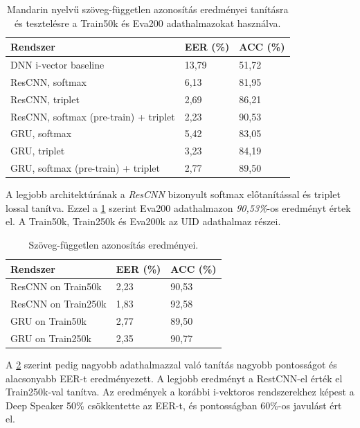 \begin{table}[!ht]
	\begin{tabular}{*3l} \toprule
		\bfseries Rendszer & \bfseries EER (\%) & \bfseries ACC (\%) \\ \midrule
		DNN i-vector baseline & 13,79 & 51,72 \\
		\rowcolor{gray!10}
		ResCNN, softmax & 6,13 & 81,95 \\
		ResCNN, triplet & 2,69 & 86,21 \\
		\rowcolor{gray!10}
		ResCNN, softmax (pre-train) + triplet & 2,23 & 90,53 \\
		GRU, softmax & 5,42 & 83,05 \\
		GRU, triplet & 3,23 & 84,19 \\
		\rowcolor{gray!10}
		GRU, softmax (pre-train) + triplet & 2,77 & 89,50 \\
		\bottomrule
		\hline
	\end{tabular}
	\centering
	\caption{Mandarin nyelvű szöveg-független azonosítás eredményei tanításra és tesztelésre a Train50k és Eva200 adathalmazokat használva.}
	\label{fig:deep-speaker-independent-mandarin-results}
\end{table}

A legjobb architektúrának a \emph{ResCNN} bizonyult softmax előtanítással és triplet lossal tanítva. Ezzel a \ref{fig:deep-speaker-independent-mandarin-results} szerint Eva200 adathalmazon \emph{90,53\%}-os eredményt értek el. A Train50k, Train250k és Eva200k az UID adathalmaz részei.

\begin{table}[!ht]
	\begin{tabular}{*3l} \toprule
		\bfseries Rendszer & \bfseries EER (\%) & \bfseries ACC (\%) \\ \midrule
		ResCNN on Train50k & 2,23 & 90,53 \\
		\rowcolor{gray!10} 
		ResCNN on Train250k & 1,83 & 92,58 \\
		GRU on Train50k & 2,77 & 89,50 \\
		\rowcolor{gray!10} 
		GRU on Train250k & 2,35 & 90,77 \\
		\bottomrule
		\hline
	\end{tabular}
	\centering
	\caption{Szöveg-független azonosítás eredményei.}
	\label{fig:deep-speaker-independent}
\end{table}

A \ref{fig:deep-speaker-independent} szerint pedig nagyobb adathalmazzal való tanítás nagyobb pontosságot és alacsonyabb EER-t eredményezett. A legjobb eredményt a RestCNN-el érték el Train250k-val tanítva.
\newline
\newline
Az eredmények a korábbi i-vektoros rendszerekhez képest a Deep Speaker 50\% csökkentette az EER-t, és pontosságban 60\%-os javulást ért el.

